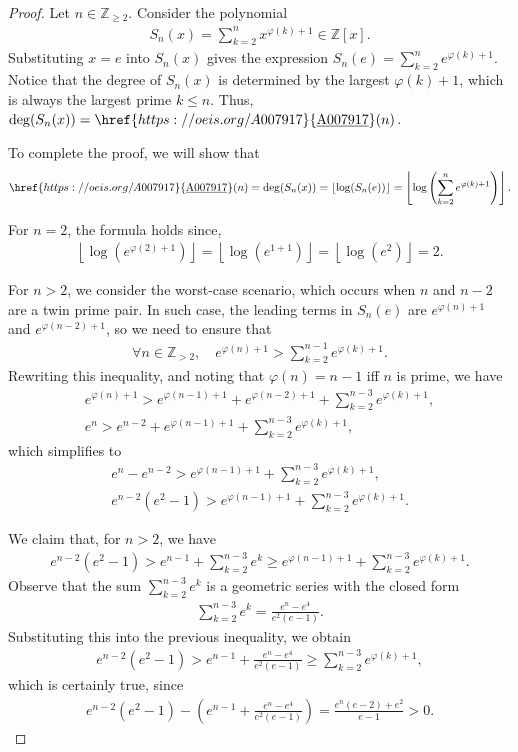 \documentclass[10pt,a4paper]{article}
\theoremstyle{plain}
\newcommand{\floor}[1]{\left\lfloor #1 \right\rfloor}
\newcommand{\Z}{\mathbb{Z}}
\newcommand{\seqnum}[1]{\href{https://oeis.org/#1}{\rm \underline{#1}}}
\begin{document}
\begin{proof}
Let $n \in \Z_{\geq 2}$. Consider the polynomial
\begin{align*}
S_n(x) = \sum_{k=2}^n x^{\varphi(k)+1} \in \Z[x].
\end{align*}
Substituting $x = e$ into $S_n(x)$ gives the expression $S_n(e) = \sum_{k=2}^n e^{\varphi(k)+1}$. Notice that the degree of $S_n(x)$ is determined by the largest $\varphi(k) + 1$, which is always the largest prime $k \leq n$. Thus, $\deg(S_n(x)) = \seqnum{A007917}(n)$.

To complete the proof, we will show that 
\begin{align*}
\seqnum{A007917}(n) = \deg(S_n(x)) = \floor{\log(S_n(e))} = \floor{ \log\left( \sum_{k=2}^n e^{\varphi(k)+1} \right) } .
\end{align*}

For $n=2$, the formula holds since,
\begin{align*}
    \floor{\log(e^{\varphi(2)+1})} = \floor{\log(e^{1+1})} = \floor{\log(e^2)} = 2 .
\end{align*}

For $n > 2$, we consider the worst-case scenario, which occurs when $n$ and $n-2$ are a twin prime pair. In such case, the leading terms in $S_n(e)$ are $e^{\varphi(n)+1}$ and $e^{\varphi(n-2)+1}$, so we need to ensure that
\begin{align*}
\forall n \in \Z_{>2}, \quad
e^{\varphi(n)+1} > \sum_{k=2}^{n-1} e^{\varphi(k)+1} .
\end{align*}
Rewriting this inequality, and noting that $\varphi(n) = n-1$ iff $n$ is prime, we have
\begin{align*}
e^{\varphi(n)+1} > e^{\varphi(n-1)+1} + e^{\varphi(n-2)+1} + \sum_{k=2}^{n-3} e^{\varphi(k)+1} , \\
e^n > e^{n-2} + e^{\varphi(n-1)+1} + \sum_{k=2}^{n-3} e^{\varphi(k)+1} ,
\end{align*}
which simplifies to
\begin{align*}
e^n - e^{n-2} > e^{\varphi(n-1)+1} + \sum_{k=2}^{n-3} e^{\varphi(k)+1} , \\
e^{n-2} (e^2-1) > e^{\varphi(n-1)+1} + \sum_{k=2}^{n-3} e^{\varphi(k)+1}.
\end{align*}

We claim that, for $n > 2$, we have
\begin{align*}
e^{n-2} (e^2-1) > e^{n-1} + \sum_{k=2}^{n-3} e^k \geq e^{\varphi(n-1)+1} + \sum_{k=2}^{n-3} e^{\varphi(k)+1}.
\end{align*}
Observe that the sum $\sum_{k=2}^{n-3} e^k$ is a geometric series with the closed form
\begin{align*}
\sum_{k=2}^{n-3} e^k = \frac{e^n-e^4}{e^2(e-1)} .
\end{align*}
Substituting this into the previous inequality, we obtain
\begin{align*}
e^{n-2} (e^2-1) > e^{n-1} + \frac{e^n-e^4}{e^2(e-1)} \geq \sum_{k=2}^{n-3} e^{\varphi(k)+1} ,
\end{align*}
which is certainly true, since
\begin{align*}
    e^{n-2} (e^2-1) - \left(e^{n-1} + \frac{e^n-e^4}{e^2(e-1)}\right) = \frac{e^n (e-2) + e^2}{e-1} > 0 .
\end{align*}


\end{proof}
\end{document}
